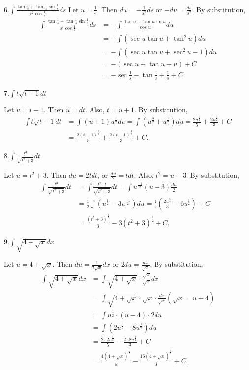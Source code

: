 \documentclass[
  letterpaper,
  DIV=11,
  numbers=noendperiod]{scrartcl}
\theoremstyle{definition}
\theoremstyle{plain}
\theoremstyle{remark}
\begin{document}
6.\(\int \frac{\tan\frac{1}{s}+\tan\frac{1}{s}\sin\frac{1}{s}}{s^2\cos\frac{1}{s}}ds\)
Let \(u=\frac{1}{s}\). Then \(du=-\frac{1}{s^2}ds\) or
\(-du=\frac{ds}{s^2}\). By substitution, \[
\begin{aligned}
\int \frac{\tan\frac{1}{s}+\tan\frac{1}{s}\sin\frac{1}{s}}{s^2\cos\frac{1}{s}}ds &= -\int \frac{\tan u+\tan u \sin u}{\cos u}du\\&=-\int (\sec u \tan u + \tan^2 u)du\\&=-\int (\sec u \tan u +\sec^2 u -1 )du\\&=-(\sec u +\tan u-u) + C\\&=-\sec\frac{1}{s}-\tan\frac{1}{s}+\frac{1}{s}+C.  
\end{aligned}
\]

7.\(\int t\sqrt {t-1} dt\)

Let \(u=t-1\). Then \(u=dt\). Also, \(t=u+1\). By substitution,
\[ \begin{aligned}
\int t\sqrt{t-1} dt &=\int \left(u+1\right)u^\frac{1}{2}du =\int \left( u^\frac{3}{2}+u^\frac{1}{2} \right)du =\frac{2u^\frac{5}{2}}{5}+\frac{2u^\frac{3}{2}}{3}+C\\&=\frac{2\left(t-1\right)^\frac{5}{2}}{5}+\frac{2\left(t-1\right)^\frac{3}{2}}{3}+C.
\end{aligned}
\]

8.\(\int \frac{t^3}{\sqrt{t^2+3}}dt\)

Let \(u=t^2+3\). Then \(du=2tdt\), or \(\frac{du}{2}=tdt\). Also,
\(t^2=u-3\). By substitution, \[
\begin{aligned}
\int \frac{t^3}{\sqrt{t^2+3}}dt &= \int \frac{t^2\cdot{t}}{\sqrt {t^2+3}}dt=\int u^\frac{-1}{2}(u-3)\frac{du}{2}&\\&=\frac{1}{2}\int \left(u^\frac{1}{2}-3u^\frac{-1}{2}\right)du =\frac{1}{2} \left(\frac{2u^\frac{3}{2}}{3}-6u^\frac{1}{2}\right)+C \\& =\frac{\left(t^2+3\right)^\frac{3}{2}}{3}-3\left(t^2+3\right)^\frac{1}{2}+C.
\end{aligned}
\]

9.\(\int \sqrt{4+\sqrt x}dx\)

Let \(u=4+\sqrt x\). Then \(du=\frac{1}{2\sqrt x}dx\) or
\(2du=\frac{dx}{\sqrt x}\). By substitution, \[
\begin{aligned}
\int \sqrt{4+\sqrt x}dx&=\int \sqrt{4+\sqrt x} \cdot\frac{\sqrt x}{\sqrt x}dx\\&=\int \sqrt{4+\sqrt x} \cdot \sqrt x\cdot \frac{dx}{\sqrt x} (\sqrt x=u-4)\\&=\int u^\frac{1}{2}\cdot (u-4)\cdot 2du\\&=\int(2u^\frac{3}{2}-8u^\frac{1}{2}) du\\&=\frac{2\cdot2u^\frac{5}{2}}5-\frac{2\cdot 8u^\frac{3}{2}}{3}+C\\&=\frac{4\left (4+\sqrt x\right)^\frac{5}{2}}{5}-\frac{16\left(4+\sqrt x\right)^\frac{3}{2}}{3}+C.
\end{aligned}
\]
\end{document}
